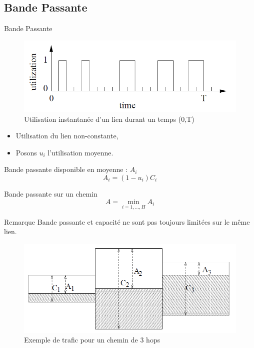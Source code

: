 \documentclass[compress]{beamer}
\begin{document}
\subsection{Bande Passante}
\begin{frame}{Bande Passante}
	\begin{figure}[hbtp]
		\centering
		\includegraphics[scale=0.42]{schema2.PNG}
		\caption{Utilisation instantanée d'un lien durant un temps (0,T)}
	\end{figure}
	\begin{itemize}
		\item Utilisation du lien non-constante,
		\item Posons $u_i$ l'utilisation moyenne. 
	\end{itemize}
	\begin{block}{Bande passante disponible en moyenne : $A_{i}$}
		$$ A_i = (1 - u_i) C_i $$
	\end{block}
\end{frame}


\begin{frame}
	\begin{block}{Bande passante sur un chemin}
		$$A = \min\limits_{i=1,...,H} A_{i}$$
	\end{block}
	\begin{alertblock}{Remarque}
		Bande passante et capacité ne sont pas toujours limitées sur le même lien. 
	\end{alertblock}
	\begin{figure}[hbtp]
		\centering
		\includegraphics[scale=0.42]{schema3.PNG}
		\caption{Exemple de trafic pour un chemin de 3 hops}
	\end{figure}
	
\end{frame}
\end{document}
